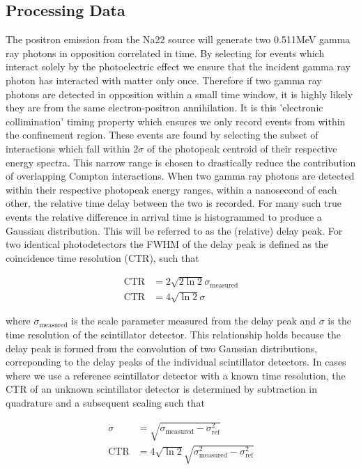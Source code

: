 \subsection{Processing Data}
The positron emission from the Na22 source will generate two 0.511MeV gamma ray photons in opposition correlated in time. By selecting for events which interact solely by the photoelectric effect we ensure that the incident gamma ray photon has interacted with matter only once. Therefore if two gamma ray photons are detected in opposition within a small time window, it is highly likely they are from the same electron-positron annihilation. It is this 'electronic collimination' timing property which ensures we only record events from within the confinement region. These events are found by selecting the subset of interactions which fall within $2\sigma$ of the photopeak centroid of their respective energy spectra. This narrow range is chosen to drastically reduce the contribution of overlapping Compton interactions. When two gamma ray photons are detected within their respective photopeak energy ranges, within a nanosecond of each other, the relative time delay between the two is recorded. For many such true events the relative difference in  arrival time is histogrammed to produce a Gaussian distribution. This will be referred to as the (relative) delay peak. For two identical photodetectors the FWHM of the delay peak is defined as the coincidence time resolution (CTR), such that

\begin{align}
\text{CTR} &= 2\sqrt{2\ln{2}}\sigma_\text{measured}\\
\text{CTR} &= 4\sqrt{\ln{2}}\sigma
\label{eqn:ctrtoscale}
\end{align}

where $\sigma_\textrm{measured}$ is the scale parameter measured from the delay peak and $\sigma$ is the time resolution of the scintillator detector. This relationship holds because the delay peak is formed from the convolution of two Gaussian distributions, correponding to the delay peaks of the individual scintillator detectors. In cases where we use a reference scintillator detector with a known time resolution, the CTR of an unknown scintillator detector is determined by subtraction in quadrature and a subsequent scaling such that

\begin{align}
\sigma &= \sqrt{\sigma_\textrm{measured} - \sigma_\textrm{ref}^2}\\
\text{CTR} &= 4\sqrt{\ln{2}}\sqrt{\sigma_\textrm{measured}^2-\sigma_\textrm{ref}^2}
\end{align}

